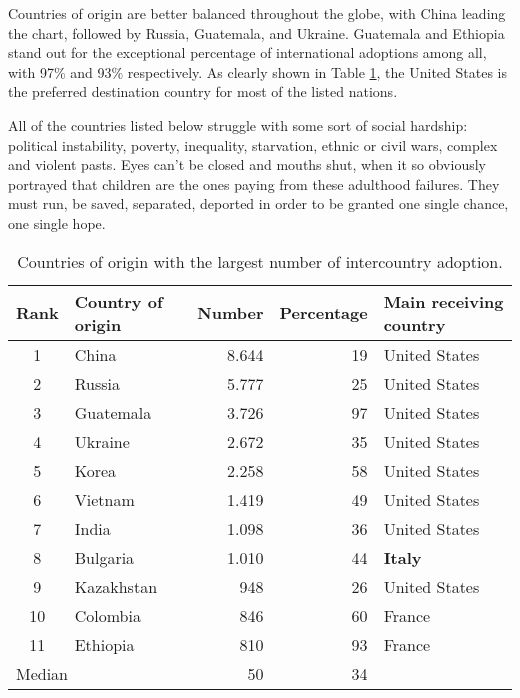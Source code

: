 Countries of origin are better balanced throughout the globe, with China leading the chart, followed by Russia, Guatemala, and Ukraine. Guatemala and Ethiopia stand out for the exceptional percentage of international adoptions among all, with 97\% and 93\% respectively. As clearly shown in Table \ref{tab:intadoptcountriesorigin}, the United States is the preferred destination country for most of the listed nations. 

All of the countries listed below struggle with some sort of social hardship: political instability, poverty, inequality, starvation, ethnic or civil wars, complex and violent pasts. Eyes can't be closed and mouths shut, when it so obviously portrayed that children are the ones paying from these adulthood failures. They must run, be saved, separated, deported in order to be granted one single chance, one single hope.

\begin{table}[H]
   \centering
   \begin{tabular}{c l r r l}
      Rank & Country of origin\footnotemark[1] & Number & Percentage & Main receiving country\\
      \hline
      1 & China & 8.644 & 19 & United States\\
      2 & Russia & 5.777 & 25 & United States\\
      3 & Guatemala & 3.726 & 97 & United States\\
      4 & Ukraine & 2.672 & 35 & United States\\
      5 & Korea & 2.258 & 58 & United States\\
      6 & Vietnam & 1.419 & 49 & United States\\
      7 & India & 1.098 & 36 & United States\\
      8 & Bulgaria & 1.010 & 44 &  \textcolor{BrickRed}{\textbf{Italy}}\\
      9 & Kazakhstan & 948 & 26 & United States\\
      10 & Colombia & 846 & 60 & France\\
      11 & Ethiopia & 810 & 93 & France\\
      \hline
      \multicolumn{2}{l}{Median} & 50 & 34 &\\
   \end{tabular}
   \caption{Countries of origin with the largest number of intercountry adoption.}
    \label{tab:intadoptcountriesorigin}
\end{table}

